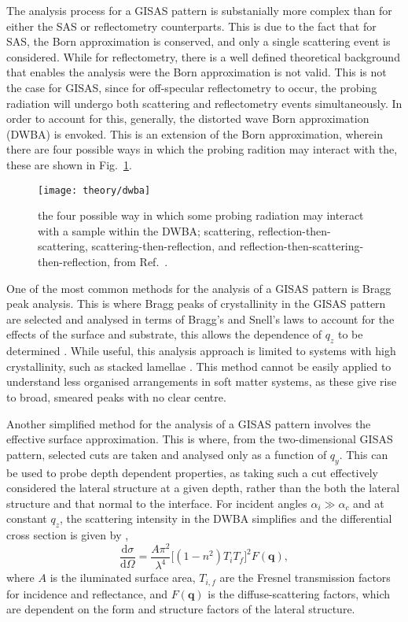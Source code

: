 The analysis process for a GISAS pattern is substanially more complex than for either the SAS or reflectometry counterparts.
This is due to the fact that for SAS, the Born approximation is conserved, and only a single scattering event is considered.
While for reflectometry, there is a well defined theoretical background that enables the analysis were the Born approximation is not valid.
This is not the case for GISAS, since for off-specular reflectometry to occur, the probing radiation will undergo both scattering and reflectometry events simultaneously.
In order to account for this, generally, the distorted wave Born approximation (DWBA) is envoked.
This is an extension of the Born approximation, wherein there are four possible ways in which the probing radition may interact with the, these are shown in Fig.~\ref{fig:dwba}.
%
\begin{figure}
	\centering
	\texttt{[image: theory/dwba]}
	\caption{the four possible way in which some probing radiation may interact with a sample within the DWBA; scattering, reflection-then-scattering, scattering-then-reflection, and reflection-then-scattering-then-reflection, from Ref.~\cite{Hexemer2015}.}
	\label{fig:dwba}
\end{figure}
%

One of the most common methods for the analysis of a GISAS pattern is Bragg peak analysis.
This is where Bragg peaks of crystallinity in the GISAS pattern are selected and analysed in terms of Bragg's and Snell's laws to account for the effects of the surface and substrate, this allows the dependence of $q_z$ to be determined \cite{Lee2007, Busch2006}.
While useful, this analysis approach is limited to systems with high crystallinity, such as stacked lamellae \cite{Busch2007}.
This method cannot be easily applied to understand less organised arrangements in soft matter systems, as these give rise to broad, smeared peaks with no clear centre.

Another simplified method for the analysis of a GISAS pattern involves the effective surface approximation.
This is where, from the two-dimensional GISAS pattern, selected cuts are taken and analysed only as a function of $q_y$.
This can be used to probe depth dependent properties, as taking such a cut effectively considered the lateral structure at a given depth, rather than the both the lateral structure and that normal to the interface.
For incident angles $\alpha_i \gg \alpha_c$ and at constant $q_z$, the scattering intensity in the DWBA simplifies and the differential cross section is given by \cite{Naudon2000},
%
\begin{equation}
	\frac{\text{d}\sigma}{\text{d}\Omega} = \frac{A\pi^2}{\lambda^4}\big[(1 - n^2)T_iT_f\big]^2F(\mathbf{q}),
\end{equation}
%
where $A$ is the iluminated surface area, $T_{i,f}$ are the Fresnel transmission factors for incidence and reflectance, and $F(\mathbf{q})$ is the diffuse-scattering factors, which are dependent on the form and structure factors of the lateral structure.

